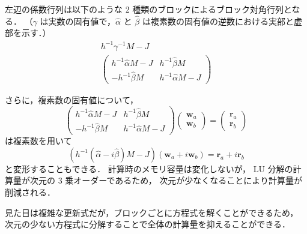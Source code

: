 左辺の係数行列は以下のような 2 種類のブロックによるブロック対角行列となる．
（$\gamma$ は実数の固有値で，$\hat{\alpha}$ と $\hat{\beta}$ は複素数の固有値の逆数における実部と虚部を示す．）
\begin{gather}
    h^{-1} \gamma^{-1} M -J
    \\
    \begin{pmatrix}
        h^{-1} \hat{\alpha} M - J & h^{-1} \hat{\beta} M      \\
        -h^{-1} \hat{\beta} M     & h^{-1} \hat{\alpha} M - J
    \end{pmatrix}
\end{gather}

さらに，複素数の固有値について，
\begin{equation}
    \begin{pmatrix}
        h^{-1} \hat{\alpha} M - J & h^{-1} \hat{\beta} M      \\
        -h^{-1} \hat{\beta} M     & h^{-1} \hat{\alpha} M - J
    \end{pmatrix}
    \begin{pmatrix}
        \bm{w}_a \\
        \bm{w}_b
    \end{pmatrix}
    =
    \begin{pmatrix}
        \bm{r}_a \\
        \bm{r}_b
    \end{pmatrix}
\end{equation}
は複素数を用いて
\begin{equation}
    (h^{-1} (\hat{\alpha} - i \hat{\beta}) M - J) (\bm{w}_a + i \bm{w}_b)
    = \bm{r}_a + i \bm{r}_b
\end{equation}
と変形することもできる．
計算時のメモリ容量は変化しないが，
LU 分解の計算量が次元の 3 乗オーダーであるため，
次元が少なくなることにより計算量が削減される．

見た目は複雑な更新式だが，ブロックごとに方程式を解くことができるため，
次元の少ない方程式に分解することで全体の計算量を抑えることができる．

